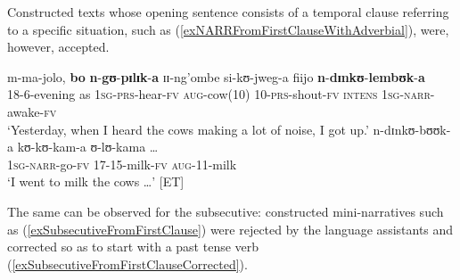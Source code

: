 Constructed texts whose opening sentence consists of a temporal clause referring to a specific situation, such as (\ref{exNARRFromFirstClauseWithAdverbial}), were, however, accepted.
\begin{exe} %
	\ex \label{exNARRFromFirstClauseWithAdverbial} \begin{xlist}
		\ex \gll m-ma-jolo, \textbf{bo} \textbf{n}-\textbf{gʊ}-\textbf{pɪlɪk}-\textbf{a} ɪɪ-ng'ombe si-kʊ-jweg-a fiijo \textbf{n}-\textbf{dɪnkʊ}-\textbf{lembʊk}-\textbf{a}\\
		18-6-evening as \textsc{1sg}-\textsc{prs}-hear-\textsc{fv} \textsc{aug}-cow(10) 10-\textsc{prs}-shout-\textsc{fv} \textsc{intens} \textsc{1sg}-\textsc{narr}-awake-\textsc{fv}\\
		\glt `Yesterday, when I heard the cows making a lot of noise, I got up.'
		\ex \gll n-dɪnkʊ-bʊʊk-a kʊ-kʊ-kam-a ʊ-lʊ-kama \ldots\\
		\textsc{1sg}-\textsc{narr}-go-\textsc{fv} 17-15-milk-\textsc{fv} \textsc{aug}-11-milk\\
		\glt `I went to milk the cows …' [ET]
	\end{xlist}
\end{exe}

The same can be observed for the subsecutive: constructed mini-narratives such as (\ref{exSubsecutiveFromFirstClause}) were rejected by the language assistants and corrected so as to start with a past tense verb (\ref{exSubsecutiveFromFirstClauseCorrected}).

